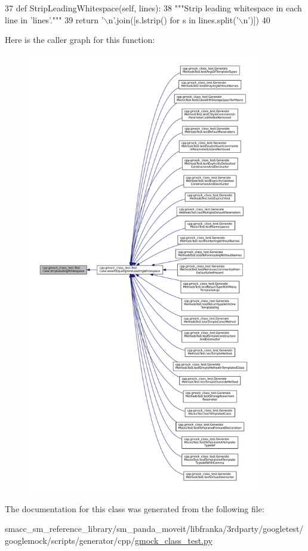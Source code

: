 \begin{DoxyCode}
37   \textcolor{keyword}{def }StripLeadingWhitespace(self, lines):
38     \textcolor{stringliteral}{"""Strip leading whitespace in each line in 'lines'."""}
39     \textcolor{keywordflow}{return} \textcolor{stringliteral}{'\(\backslash\)n'}.join([s.lstrip() \textcolor{keywordflow}{for} s \textcolor{keywordflow}{in} lines.split(\textcolor{stringliteral}{'\(\backslash\)n'})])
40 
\end{DoxyCode}
Here is the caller graph for this function\+:
\nopagebreak
\begin{figure}[H]
\begin{center}
\leavevmode
\includegraphics[height=550pt]{classcpp_1_1gmock__class__test_1_1TestCase_a366b15717eebc41e397357868c5734c5_icgraph}
\end{center}
\end{figure}


The documentation for this class was generated from the following file\+:\begin{DoxyCompactItemize}
\item 
smacc\+\_\+sm\+\_\+reference\+\_\+library/sm\+\_\+panda\+\_\+moveit/libfranka/3rdparty/googletest/googlemock/scripts/generator/cpp/\hyperlink{gmock__class__test_8py}{gmock\+\_\+class\+\_\+test.\+py}\end{DoxyCompactItemize}
